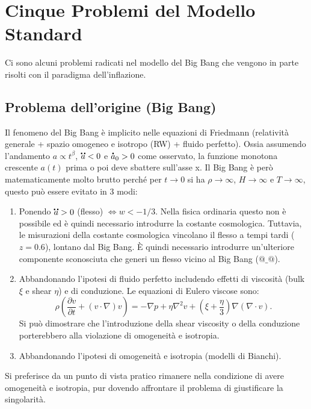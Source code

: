 \chapter{Cinque Problemi del Modello Standard}\label{4:ch}

Ci sono alcuni problemi radicati nel modello del Big Bang che vengono in parte risolti con il paradigma dell'inflazione.

\section{Problema dell'origine (Big Bang)}
Il fenomeno del Big Bang è implicito nelle equazioni di Friedmann (relatività generale + spazio omogeneo e isotropo (RW) + fluido perfetto). Ossia assumendo l'andamento $a\propto t^\beta$, $\accentset{\mbox{\large\bfseries ..}}{a}<0$ e $\accentset{\mbox{\large\bfseries .}}{a}_0 >0$ come osservato, la funzione monotona crescente $a(t)$ prima o poi deve sbattere sull'asse x.   
Il Big Bang è però matematicamente molto brutto perché per $t\rightarrow 0$ si ha $\rho \rightarrow \infty$, $H \rightarrow \infty$ e $T \rightarrow \infty$, questo può essere evitato in 3 modi:
\vspace{0.5em}
\begin{enumerate}
    \item Ponendo $\accentset{\mbox{\large\bfseries ..}}{a}>0$ (flesso) $\Leftrightarrow w<-1/3$. Nella fisica ordinaria questo non è possibile ed è quindi necessario introdurre la costante cosmologica. Tuttavia, le misurazioni della costante cosmologica vincolano il flesso a tempi tardi ($z=0.6$), lontano dal Big Bang. È quindi necessario introdurre un'ulteriore componente sconosciuta che generi un flesso vicino al Big Bang ($@ \_ @$).
    \item Abbandonando l'ipotesi di fluido perfetto includendo effetti di viscosità (bulk $\xi$ e shear $\eta$) e di conduzione. Le equazioni di Eulero viscose sono: $$ \rho \left ( \frac{\partial v}{\partial t} + (v \cdot\nabla)v \right )= -\nabla p +\eta \nabla^2v + \left ( \xi + \frac{\eta}{3} \right )\nabla(\nabla\cdot v). $$ Si può dimostrare che l'introduzione della shear viscosity o della conduzione porterebbero alla violazione di omogeneità e isotropia.
    \item Abbandonando l'ipotesi di omogeneità e isotropia (modelli di Bianchi).
\end{enumerate}

Si preferisce da un punto di vista pratico rimanere nella condizione di avere omogeneità e isotropia, pur dovendo affrontare il problema di giustificare la singolarità.

